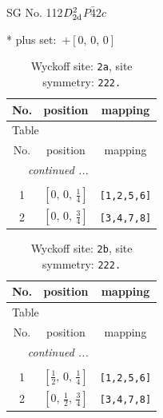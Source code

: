 \documentclass[fleqn,8pt]{jsarticle}
\begin{document}
\setcounter{MaxMatrixCols}{32}

\renewcommand{\tablename}{Table~}
\renewcommand{\figurename}{Figure~}
\begin{center}
\LARGE
SG No. 112\quad$D_{\rm 2d}^{2}$\quad$P\bar{4}2c$\quad[ tetragonal ]
\end{center}
* plus set:\,\,\,$+\left[ 0,\, 0,\, 0 \right]$
\renewcommand{\arraystretch}{1.2}
\begin{longtable}{ccc}
\caption{Wyckoff site: {\tt 2a}, site symmetry: {\tt 222.}}
 \\
 \hline \hline
No. & position & mapping \\ \hline \endfirsthead

\multicolumn{2}{l}{\tablename\ \thetable{}} \\
 \hline \hline
No. & position & mapping \\ \hline \endhead

 \hline \hline
\multicolumn{2}{r}{\footnotesize\it continued ...} \\ \endfoot

 \hline \hline
\multicolumn{2}{r}{} \\ \endlastfoot

1 & $\left[ 0,\, 0,\, \frac{1}{4} \right]$ & {\tt [1,2,5,6]} \\ \hline
2 & $\left[ 0,\, 0,\, \frac{3}{4} \right]$ & {\tt [3,4,7,8]} \\
\end{longtable}
\renewcommand{\arraystretch}{1.2}
\begin{longtable}{ccc}
\caption{Wyckoff site: {\tt 2b}, site symmetry: {\tt 222.}}
 \\
 \hline \hline
No. & position & mapping \\ \hline \endfirsthead

\multicolumn{2}{l}{\tablename\ \thetable{}} \\
 \hline \hline
No. & position & mapping \\ \hline \endhead

 \hline \hline
\multicolumn{2}{r}{\footnotesize\it continued ...} \\ \endfoot

 \hline \hline
\multicolumn{2}{r}{} \\ \endlastfoot

1 & $\left[ \frac{1}{2},\, 0,\, \frac{1}{4} \right]$ & {\tt [1,2,5,6]} \\ \hline
2 & $\left[ 0,\, \frac{1}{2},\, \frac{3}{4} \right]$ & {\tt [3,4,7,8]} \\
\end{longtable}
\end{document}
